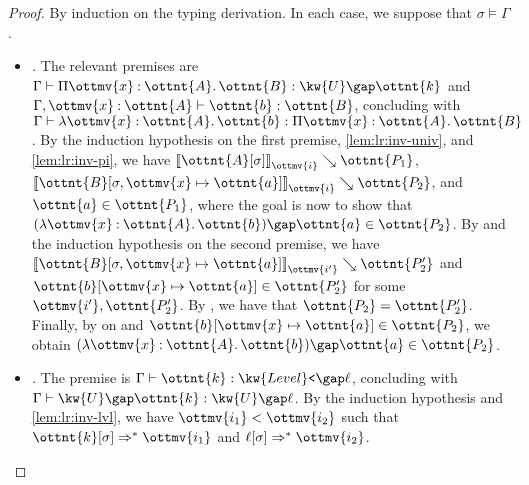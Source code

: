 \documentclass[a4paper,UKenglish,cleveref,autoref,thm-restate]{lipics-v2021}
\begin{document}
\begin{proof}
  By induction on the typing derivation.
  In each case, we suppose that $ \sigma  \vDash  \Gamma $.
  \begin{itemize}[topsep=0pt]
    \item \textit{.}
      The relevant premises are $ \Gamma  \vdash   \Pi  \ottmv{x}  \mathbin{:}  \ottnt{A}  \mathpunct{.}  \ottnt{B}   \mathrel{:}   \kw{U} \gap  \ottnt{k}  $ and $  \Gamma ,  \ottmv{x}  \mathbin{:}  \ottnt{A}   \vdash  \ottnt{b}  \mathrel{:}  \ottnt{B} $,
      concluding with $ \Gamma  \vdash   \lambda  \ottmv{x}  \mathbin{:}  \ottnt{A}  \mathpunct{.}  \ottnt{b}   \mathrel{:}   \Pi  \ottmv{x}  \mathbin{:}  \ottnt{A}  \mathpunct{.}  \ottnt{B}  $.
      By the induction hypothesis on the first premise,
      \cref{lem:lr:inv-univ}, and \cref{lem:lr:inv-pi},
      we have $ \mathopen{\llbracket}   \ottnt{A} [  \sigma  ]   \mathclose{\rrbracket}_{ \ottmv{i} } \searrow  \ottnt{P_{{\mathrm{1}}}} $, $ \mathopen{\llbracket}   \ottnt{B} [   \sigma ,  \ottmv{x}  \mapsto  \ottnt{a}   ]   \mathclose{\rrbracket}_{ \ottmv{i} } \searrow  \ottnt{P_{{\mathrm{2}}}} $, and $ \ottnt{a}  \in  \ottnt{P_{{\mathrm{1}}}} $,
      where the goal is now to show that $   (  \lambda  \ottmv{x}  \mathbin{:}  \ottnt{A}  \mathpunct{.}  \ottnt{b}  )   \gap  \ottnt{a}   \in  \ottnt{P_{{\mathrm{2}}}} $.
      By  and the induction hypothesis on the second premise,
      we have $ \mathopen{\llbracket}   \ottnt{B} [   \sigma ,  \ottmv{x}  \mapsto  \ottnt{a}   ]   \mathclose{\rrbracket}_{ \ottmv{i'} } \searrow  \ottnt{P'_{{\mathrm{2}}}} $ and $  \ottnt{b} [  \ottmv{x}  \mapsto  \ottnt{a}  ]   \in  \ottnt{P'_{{\mathrm{2}}}} $ for some $\ottmv{i'}, \ottnt{P'_{{\mathrm{2}}}}$.
      By , we have that $\ottnt{P_{{\mathrm{2}}}} = \ottnt{P'_{{\mathrm{2}}}}$.
      Finally, by  on  and $  \ottnt{b} [  \ottmv{x}  \mapsto  \ottnt{a}  ]   \in  \ottnt{P_{{\mathrm{2}}}} $,
      we obtain $   (  \lambda  \ottmv{x}  \mathbin{:}  \ottnt{A}  \mathpunct{.}  \ottnt{b}  )   \gap  \ottnt{a}   \in  \ottnt{P_{{\mathrm{2}}}} $.
    \item \textit{.}
      The premise is $ \Gamma  \vdash  \ottnt{k}  \mathrel{:}   \kw{Level}\texttt{<} \gap  \ell  $,
      concluding with $ \Gamma  \vdash   \kw{U} \gap  \ottnt{k}   \mathrel{:}   \kw{U} \gap  \ell  $.
      By the induction hypothesis and \cref{lem:lr:inv-lvl},
      we have $ \ottmv{i_{{\mathrm{1}}}}  <  \ottmv{i_{{\mathrm{2}}}} $ such that $  \ottnt{k} [  \sigma  ]   \Rightarrow^\ast   \ottmv{i_{{\mathrm{1}}}}  $ and $  \ell [  \sigma  ]   \Rightarrow^\ast   \ottmv{i_{{\mathrm{2}}}}  $.

\end{itemize}
\end{proof}
\end{document}

